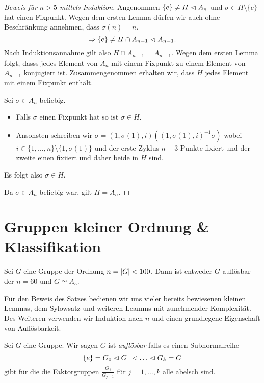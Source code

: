 \begin{proof}[Beweis für $n > 5$ mittels Induktion]
	Angenommen $\{e\} \neq H \vartriangleleft A_{n}$ und $\sigma \in H \setminus \{e\}$ hat einen Fixpunkt.
	Wegen dem ersten Lemma dürfen wir auch ohne Beschränkung annehmen, dass $\sigma(n) = n$.
	\[
	\Rightarrow \{e\}  \neq H \cap A_{n-1} \vartriangleleft A_{n-1}
	.\] 
	Nach Induktionsannahme gilt also $H \cap A_{n-1} = A_{n-1}$.
	Wegen dem ersten Lemma folgt, dasss jedes Element von $A_{n}$ mit einem Fixpunkt zu einem Element von $A_{n-1}$ konjugiert ist.
	Zusammengenommen erhalten wir, dass $H$ jedes Element mit einem Fixpunkt enthält.
	
	Sei $\sigma \in A_{n}$ beliebig.
	\begin{itemize}
		\item Falls $\sigma$ einen Fixpunkt hat so ist $\sigma \in H$.
		\item Ansonsten schreiben wir $\sigma = (1,\sigma(1),i)((1,\sigma(1),i)^{-1} \sigma)$
			wobei $i \in \{1,\ldots,n\} \setminus \{1,\sigma(1)\} $ und der erste Zyklus $n-3$ Punkte fixiert und der zweite einen fixiiert
			und daher beide in $H$ sind.
	\end{itemize}
	Es folgt also $\sigma \in H$.

	Da $\sigma \in A_{n} $ beliebig war, gilt $H = A_{n}$.
\end{proof}

\section{Gruppen kleiner Ordnung \& Klassifikation}

\begin{theorem}
	Sei $G$ eine Gruppe der Ordnung $n = \abs{G} < 100$. 
	Dann ist entweder $G$ auflösbar der $n = 60$ und $G \simeq A_5$.
\end{theorem}

Für den Beweis des Satzes bedienen wir uns vieler bereits bewiesenen kleinen Lemmas,
dem Sylowsatz und weiteren Leamms mit zunehmender Komplexität.
Des Weiteren verwenden wir Induktion nach $n$ und einen grundlegene Eigenschaft von Auflösbarkeit.

\begin{definition}[Wiederholung]
	Sei $G$ eine Gruppe. Wir sagen $G$ ist \emph{auflösbar} falls es einen Subnormalreihe
	\[
	\{e\} = G_0 \vartriangleleft G_1 \vartriangleleft \ldots \vartriangleleft G_{k} = G
	\]
	gibt für die die Faktorgruppen $\frac{G_{j}}{G_{j-1}}$ für $j = 1,\ldots,k$ alle abelsch sind.
\end{definition}

